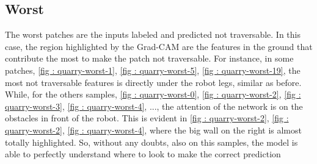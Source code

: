 \subsection{Worst}
The worst patches are the inputs labeled and predicted not traversable. In this case, the region highlighted by the Grad-CAM are the features in the ground that contribute the most to make the patch not traversable. For instance, in some patches, \ref{fig : quarry-worst-1}, \ref{fig : quarry-worst-5}, \ref{fig : quarry-worst-19}, the most not traversable features is directly under the robot legs, similar as before. While, for the others samples, \ref{fig : quarry-worst-0}, \ref{fig : quarry-worst-2}, \ref{fig : quarry-worst-3}, \ref{fig : quarry-worst-4}, ..., the attention of the network is on the obstacles in front of the robot. This is evident in  \ref{fig : quarry-worst-2}, \ref{fig : quarry-worst-2}, \ref{fig : quarry-worst-4}, where the big wall on the right is almost totally highlighted. So, without any doubts, also on this samples, the model is able to perfectly understand where to look to make the correct prediction
